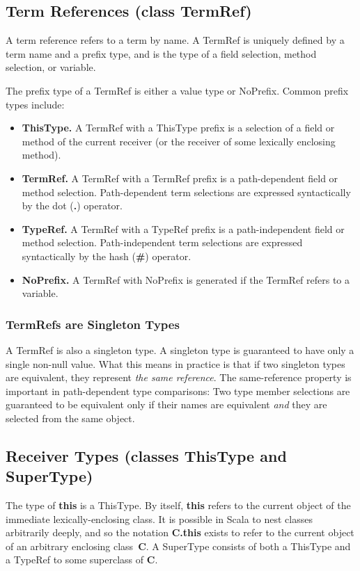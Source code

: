 \documentclass[11pt]{report}
\newcommand{\cdf}{\bf\ttfamily} %
\newcommand{\cd}{\cdf\small}  %
\begin{document}
\subsection{Term References (class TermRef)}

A term reference refers to a term by name.
A TermRef is uniquely defined by a term name and a prefix type, and is the type of a field selection, method selection, or variable.

The prefix type of a TermRef is either a value type or NoPrefix. Common prefix types include:
\begin{itemize}
\item {\bf ThisType.} A TermRef with a ThisType prefix is a selection of a field or method of the current receiver (or the receiver of some lexically enclosing method).
\item {\bf TermRef.} A TermRef with a TermRef prefix is a path-dependent field or method selection. Path-dependent term selections are expressed syntactically by the dot ({\cd .}) operator.
\item {\bf TypeRef.} A TermRef with a TypeRef prefix is a path-independent field or method selection. Path-independent term selections are expressed syntactically by the hash ({\cd \#}) operator.
\item {\bf NoPrefix.} A TermRef with NoPrefix is generated if the TermRef refers to a variable.
\end{itemize}

\subsubsection{TermRefs are Singleton Types}

A TermRef is also a singleton type. A singleton type is guaranteed to have only a single non-null value. What this means in practice is that if two singleton types are equivalent, they represent {\em the same reference}. The same-reference property is important in path-dependent type comparisons: Two type member selections are guaranteed to be equivalent only if their names are equivalent {\em and} they are selected from the same object.

\subsection{Receiver Types (classes ThisType and SuperType)}

The type of {\cd this} is a ThisType. By itself, {\cd this} refers to the current object of the immediate lexically-enclosing class. It is possible in Scala to nest classes arbitrarily deeply, and so the notation {\cd C.this} exists to refer to the current object of an arbitrary enclosing class~{\cd C}. A SuperType consists of both a ThisType and a TypeRef to some superclass of {\cd C}.
\end{document}
